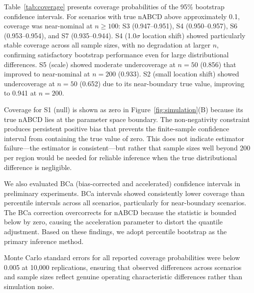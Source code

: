 \documentclass[AMA,Times1COL]{WileyNJDv5}
\begin{document}
Table~\ref{tab:coverage} presents coverage probabilities of the 95\% bootstrap confidence intervals. For scenarios with true nABCD above approximately 0.1, coverage was near-nominal at $n \geq 100$: S3 (0.947--0.951), S4 (0.950--0.957), S6 (0.953--0.954), and S7 (0.935--0.944). S4 (1.0$\sigma$ location shift) showed particularly stable coverage across all sample sizes, with no degradation at larger $n$, confirming satisfactory bootstrap performance even for large distributional differences. S5 (scale) showed moderate undercoverage at $n=50$ (0.856) that improved to near-nominal at $n=200$ (0.933). S2 (small location shift) showed undercoverage at $n=50$ (0.652) due to its near-boundary true value, improving to 0.941 at $n=200$.

Coverage for S1 (null) is shown as zero in Figure~\ref{fig:simulation}(B) because its true nABCD lies at the parameter space boundary. The non-negativity constraint produces persistent positive bias that prevents the finite-sample confidence interval from containing the true value of zero. This does not indicate estimator failure---the estimator is consistent---but rather that sample sizes well beyond 200 per region would be needed for reliable inference when the true distributional difference is negligible.

We also evaluated BCa (bias-corrected and accelerated) confidence intervals in preliminary experiments. BCa intervals showed consistently lower coverage than percentile intervals across all scenarios, particularly for near-boundary scenarios. The BCa correction overcorrects for nABCD because the statistic is bounded below by zero, causing the acceleration parameter to distort the quantile adjustment. Based on these findings, we adopt percentile bootstrap as the primary inference method.

Monte Carlo standard errors for all reported coverage probabilities were below 0.005 at 10{,}000 replications, ensuring that observed differences across scenarios and sample sizes reflect genuine operating characteristic differences rather than simulation noise.
\end{document}
